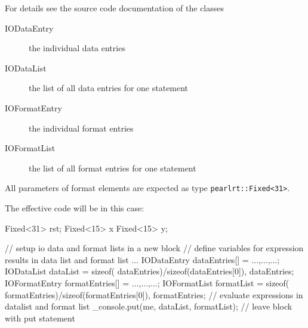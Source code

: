 For details see the source code documentation of the classes
\begin{description}
\item[IODataEntry] the individual data entries
\item[IODataList] the list of all data entries for one statement
\item[IOFormatEntry] the individual format entries
\item[IOFormatList] the list of all format entries for one statement
\end{description}

All parameters of format elements are expected as type
\verb|pearlrt::Fixed<31>|.

The effective code will be in this case:
\begin{CppCode}
Fixed<31> rst;
Fixed<15> x
Fixed<15> y;

{
  // setup io data and format lists in a new block
  // define variables for expression results in data list and format list
  ...
  IODataEntry dataEntries[] = { {...},{...},...};
  IODataList dataList = {sizeof( dataEntries)/sizeof(dataEntries[0]),
                         dataEntries};
  IOFormatEntry formatEntries[] = { {...},{...},...};
  IOFormatList formatList = {sizeof( formatEntries)/sizeof(formatEntries[0]),
                         formatEntries};
  // evaluate expressions in datalist and format list
  _console.put(me, dataList, formatList);
  // leave block with put statement
}
\end{CppCode}

